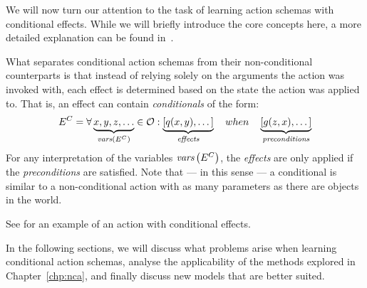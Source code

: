 \documentclass[../Master.tex]{subfiles}
\begin{document}
We will now turn our attention to the task of learning action schemas with conditional effects. While we will briefly introduce the core concepts here, a more detailed explanation can be found in~. 

What separates conditional action schemas from their non-conditional counterparts is that instead of relying solely on the arguments the action was invoked with, each effect is determined based on the state the action was applied to. That is, an effect can contain \emph{conditionals} of the form:
\begin{equation*}
    E^C = \forall \underbrace{x, y, z, \dots}_{\textit{vars} \left(E^C\right)}\in \mathcal{O} : 
    \underbrace{\left[ q(x, y), \dots \right]}_{\textit{effects}} \quad when \quad 
    \underbrace{\left[ g(z, x), \dots  \right]}_{\textit{preconditions}}
\end{equation*}
For any interpretation of the variables $\textit{vars}\left(E^C\right)$, the \textit{effects} are only applied if the \textit{preconditions} are satisfied. Note that --- in this sense --- a conditional is similar to a non-conditional action with as many parameters as there are objects in the world. 

See  for an example of an action with conditional effects. 

In the following sections, we will discuss what problems arise when learning conditional action schemas, analyse the applicability of the methods explored in Chapter~\ref{chp:nca}, and finally discuss new models that are better suited.
\end{document}
